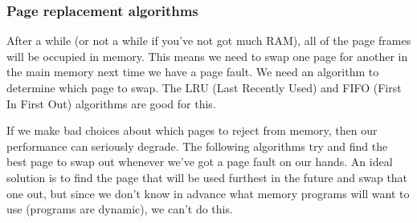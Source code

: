\subsubsection{Page replacement algorithms}

After a while (or not a while if you've not got much RAM), all of the page
frames will be occupied in memory. This means we need to swap one page for
another in the main memory next time we have a page fault. We need an algorithm
to determine which page to swap. The LRU (Last Recently Used) and FIFO (First In
First Out) algorithms are good for this.

If we make bad choices about which pages to reject from memory, then our
performance can seriously degrade. The following algorithms try and find the
best page to swap out whenever we've got a page fault on our hands. An ideal
solution is to find the page that will be used furthest in the future and swap
that one out, but since we don't know in advance what memory programs will want
to use (programs are dynamic), we can't do this.

